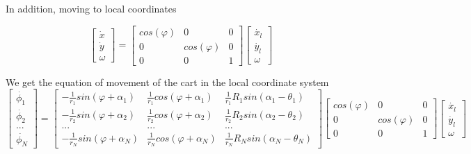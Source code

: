 \documentclass[oneside,final,14pt]{extreport}
\begin{document}
\iffalse
In addition, moving to local coordinates

\begin{equation}
\begin{bmatrix}
\dot{x} \\
\dot{y} \\
\omega
\end{bmatrix}
=
\begin{bmatrix}
cos (\varphi) & 0 & 0 \\
0 & cos (\varphi) & 0 \\
0 & 0 & 1
\end{bmatrix}
\begin{bmatrix}
\dot{x_{l}} \\
\dot{y_{l}} \\
\omega
\end{bmatrix}
\end{equation}

We get the equation of movement of the cart in the local coordinate system
\begin{equation}
\begin{bmatrix}
\dot{\phi_{1}} \\
\dot{\phi_{2}} \\
... \\
\dot{\phi_{N}}
\end{bmatrix}
=
\begin{bmatrix}
- \frac{1}{r_{1}} sin (\varphi + \alpha_{1}) &
\frac{1}{r_{1}} cos (\varphi + \alpha_{1}) &
\frac{1}{r_{1}} R_{1} sin (\alpha_{1} - \theta_{1})
\\
- \frac{1}{r_{2}} sin (\varphi + \alpha_{2}) &
\frac{1}{r_{2}} cos (\varphi + \alpha_{2}) &
\frac{1}{r_{2}} R_{2} sin (\alpha_{2} - \theta_{2})
\\
... & ... & ...
\\
- \frac{1}{r_{N}} sin (\varphi + \alpha_{N}) &
\frac{1}{r_{N}} cos (\varphi + \alpha_{N}) &
\frac{1}{r_{N}} R_{N} sin (\alpha_{N} - \theta_{N})
\end{bmatrix}
\begin{bmatrix}
cos (\varphi) & 0 & 0 \\
0 & cos (\varphi) & 0 \\
0 & 0 & 1
\end{bmatrix}
\begin{bmatrix}
\dot{x_{l}} \\
\dot{y_{l}} \\
\omega
\end{bmatrix}
\end{equation}
\end{document}

